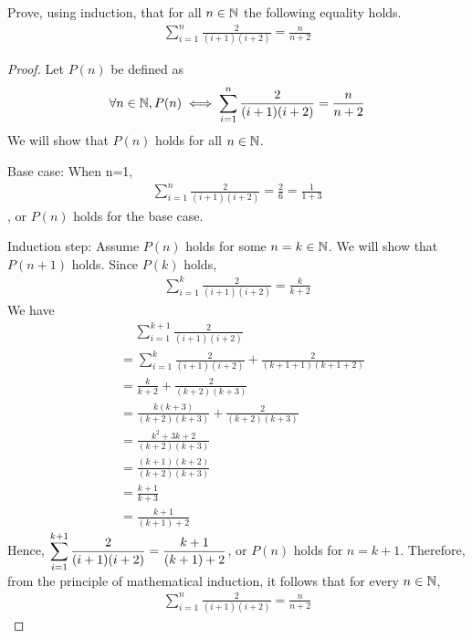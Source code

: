 \begin{question}
    \normalfont
    Prove, using induction, that for all $n\in\mathbb N$ the following equality holds.
    \[
        \begin{aligned}
            \sum_{i=1}^{n}\frac{2}{(i+1)(i+2)}=\frac{n}{n+2}
        \end{aligned}
    \]
\end{question}

\begin{proof}
    \renewcommand{\qedsymbol}{$\blacksquare$}
    Let $P(n)$ be defined as 
    \[
        \begin{aligned}
            \forall n\in\mathbb N, P(n)\iff \sum_{i=1}^{n}\frac{2}{(i+1)(i+2)}=\frac{n}{n+2}
        \end{aligned}
    \]
    We will show that $P(n)$ holds for all $n\in\mathbb N$.

    Base case: When n=1, 
    \[
        \begin{aligned}
            \sum_{i=1}^{n}\frac{2}{(i+1)(i+2)}=\frac{2}{6}=\frac{1}{1+3}
        \end{aligned}
    \]
    , or $P(n)$ holds for the base case.

    Induction step: Assume $P(n)$ holds for some $n=k\in\mathbb N$. We will show that $P(n+1)$ holds.
    Since $P(k)$ holds, 
    \[
        \begin{aligned}
            \sum_{i=1}^{k}\frac{2}{(i+1)(i+2)}=\frac{k}{k+2}
        \end{aligned}
    \]
    We have 
    \[
        \begin{aligned}
            &\quad\, \sum_{i=1}^{k+1}\frac{2}{(i+1)(i+2)}\\
            &= \sum_{i=1}^{k}\frac{2}{(i+1)(i+2)}+\frac{2}{(k+1+1)(k+1+2)}\\
            &= \frac{k}{k+2}+\frac{2}{(k+2)(k+3)}\\
            &= \frac{k(k+3)}{(k+2)(k+3)}+\frac{2}{(k+2)(k+3)}\\
            &= \frac{k^2+3k+2}{(k+2)(k+3)}\\
            &= \frac{(k+1)(k+2)}{(k+2)(k+3)}\\
            &= \frac{k+1}{k+3}\\
            &= \frac{k+1}{(k+1)+2}
        \end{aligned}
    \]
    Hence, $\mathlarger{\sum_{i=1}^{k+1}\frac{2}{(i+1)(i+2)}=\frac{k+1}{(k+1)+2}}$, or $P(n)$ holds for $n=k+1$. Therefore, from the principle of mathematical induction, it follows that for every $n\in\mathbb N$, 
    \[
        \begin{aligned}
            \sum_{i=1}^{n}\frac{2}{(i+1)(i+2)}=\frac{n}{n+2}
        \end{aligned}
    \]
\end{proof}